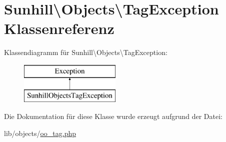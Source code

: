\hypertarget{classSunhill_1_1Objects_1_1TagException}{}\section{Sunhill\textbackslash{}Objects\textbackslash{}Tag\+Exception Klassenreferenz}
\label{classSunhill_1_1Objects_1_1TagException}
Klassendiagramm für Sunhill\textbackslash{}Objects\textbackslash{}Tag\+Exception\+:\begin{figure}[H]
\begin{center}
\leavevmode
\includegraphics[height=2.000000cm]{da/d1f/classSunhill_1_1Objects_1_1TagException}
\end{center}
\end{figure}


Die Dokumentation für diese Klasse wurde erzeugt aufgrund der Datei\+:\begin{DoxyCompactItemize}
\item 
lib/objects/\hyperlink{oo__tag_8php}{oo\+\_\+tag.\+php}\end{DoxyCompactItemize}
